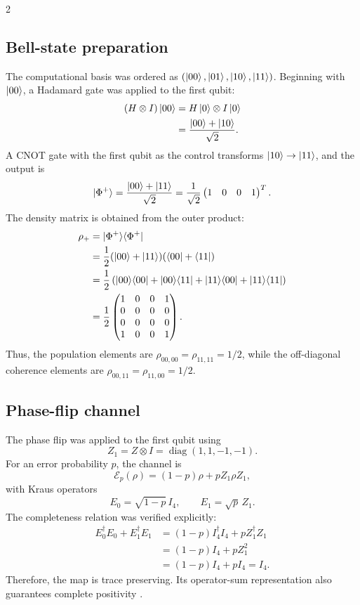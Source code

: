 \documentclass[a4paper,10pt]{article}
\begin{document}
\begin{multicols}{2}
\subsection*{Bell-state preparation}
The computational basis was ordered as
$(\ket{00},\ket{01},\ket{10},\ket{11})$.  Beginning with $\ket{00}$, a
Hadamard gate was applied to the first qubit:
\begin{align}
(H\otimes I)\ket{00}
 &=H\ket{0}\otimes I\ket{0} \\
 &=\frac{\ket{00}+\ket{10}}{\sqrt{2}}. \label{eq:hadamard}
\end{align}
A CNOT gate with the first qubit as the control transforms
$\ket{10}\rightarrow\ket{11}$, and the output is
\begin{equation}
\ket{\Phi^+}=\frac{\ket{00}+\ket{11}}{\sqrt{2}}
=\frac{1}{\sqrt{2}}
\begin{pmatrix}1&0&0&1\end{pmatrix}^{T}. \label{eq:phi-plus}
\end{equation}
The density matrix is obtained from the outer product:
\begin{align}
\rho_+&=\ket{\Phi^+}\!\bra{\Phi^+} \\
&=\frac12(\ket{00}+\ket{11})(\bra{00}+\bra{11}) \\
&=\frac12\left(\ket{00}\!\bra{00}+\ket{00}\!\bra{11}
+\ket{11}\!\bra{00}+\ket{11}\!\bra{11}\right) \\
&=\frac12\begin{pmatrix}
1&0&0&1\\
0&0&0&0\\
0&0&0&0\\
1&0&0&1
\end{pmatrix}. \label{eq:rho-plus}
\end{align}
Thus, the population elements are
$\rho_{00,00}=\rho_{11,11}=1/2$, while the off-diagonal coherence elements are
$\rho_{00,11}=\rho_{11,00}=1/2$.

\subsection*{Phase-flip channel}
The phase flip was applied to the first qubit using
\begin{equation}
Z_1=Z\otimes I=\operatorname{diag}(1,1,-1,-1).
\end{equation}
For an error probability $p$, the channel is
\begin{equation}
\mathcal{E}_p(\rho)=(1-p)\rho+pZ_1\rho Z_1,
\end{equation}
with Kraus operators
\begin{equation}
E_0=\sqrt{1-p}\,I_4, \qquad E_1=\sqrt{p}\,Z_1.
\end{equation}
The completeness relation was verified explicitly:
\begin{align}
E_0^{\dagger}E_0+E_1^{\dagger}E_1
 &=(1-p)I_4^{\dagger}I_4+pZ_1^{\dagger}Z_1 \\
 &=(1-p)I_4+pZ_1^2 \\
 &=(1-p)I_4+pI_4=I_4. \label{eq:complete}
\end{align}
Therefore, the map is trace preserving.  Its operator-sum representation also
guarantees complete positivity \cite{wood2015tensor}.


\end{multicols}
\end{document}

